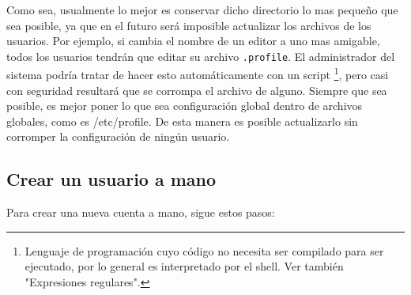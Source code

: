 \documentclass[12pt]{article}
\begin{document}
Como sea, usualmente lo mejor es conservar dicho directorio lo mas pequeño
que sea posible, ya que en el futuro será imposible actualizar los archivos de
los usuarios. Por ejemplo, si cambia el nombre de un editor a uno mas amigable,
todos los usuarios tendrán que editar su archivo  \texttt{.profile}.
El administrador del sistema podría tratar de hacer esto automáticamente con un
script \footnote{Lenguaje de programación cuyo código no necesita ser
compilado para ser ejecutado, por lo general es interpretado por el shell.
Ver también "Expresiones regulares".}, pero
	casi con seguridad resultará que se corrompa el archivo de
alguno.  Siempre que sea posible, es mejor poner lo que sea configuración global
dentro de archivos globales, como es /etc/profile. De esta manera es posible
actualizarlo sin corromper la configuración de ningún usuario.  






\subsection{Crear un usuario a mano}

Para crear una nueva cuenta a mano, sigue estos pasos:
\end{document}
